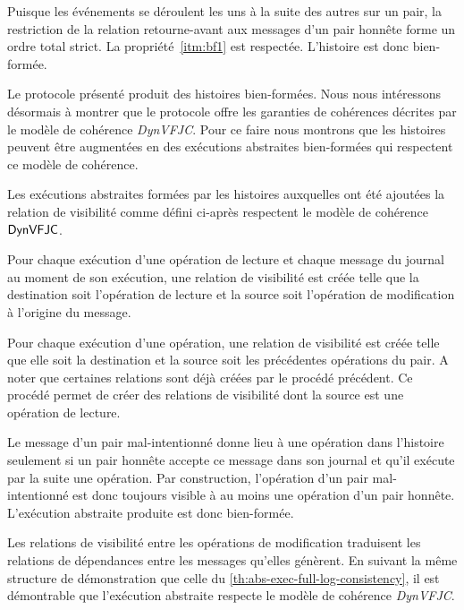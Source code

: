 Puisque les événements se déroulent les uns à la suite des autres sur un pair, la restriction de la relation retourne-avant aux messages d'un pair honnête forme un ordre total strict.
La propriété~\ref{itm:bf1} est respectée.
L'histoire est donc bien-formée.

Le protocole présenté produit des histoires bien-formées.
Nous nous intéressons désormais à montrer que le protocole offre les garanties de cohérences décrites par le modèle de cohérence \emph{DynVFJC}.
Pour ce faire nous montrons que les histoires peuvent être augmentées en des exécutions abstraites bien-formées qui respectent ce modèle de cohérence.

Les exécutions abstraites formées par les histoires auxquelles ont été ajoutées la relation de visibilité comme défini ci-après respectent le modèle de cohérence $\operatorname{\mathsf{DynVFJC}}$.

Pour chaque exécution d'une opération de lecture et chaque message du journal au moment de son exécution, une relation de visibilité est créée telle que la destination soit l'opération de lecture et la source soit l'opération de modification à l'origine du message.

Pour chaque exécution d'une opération, une relation de visibilité est créée telle que elle soit la destination et la source soit les précédentes opérations du pair.
A noter que certaines relations sont déjà créées par le procédé précédent.
Ce procédé permet de créer des relations de visibilité dont la source est une opération de lecture. 

Le message d'un pair mal-intentionné donne lieu à une opération dans l'histoire seulement si un pair honnête accepte ce message dans son journal et qu'il exécute par la suite une opération.
Par construction, l'opération d'un pair mal-intentionné est donc toujours visible à au moins une opération d'un pair honnête.
L'exécution abstraite produite est donc bien-formée.

Les relations de visibilité entre les opérations de modification traduisent les relations de dépendances entre les messages qu'elles génèrent.
En suivant la même structure de démonstration que celle du \autoref{th:abs-exec-full-log-consistency}, il est démontrable que l'exécution abstraite respecte le modèle de cohérence \emph{DynVFJC}.

